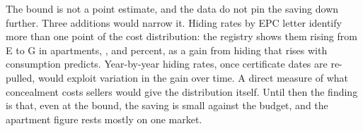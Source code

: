 The bound is not a point estimate, and the data do not pin the saving down further. Three additions would narrow it. Hiding rates by EPC letter identify more than one point of the cost distribution: the registry shows them rising from E to G in apartments, \attHideLetterEApt{}, \attHideLetterFApt{} and \attHideLetterGApt{} percent, as a gain from hiding that rises with consumption predicts. Year-by-year hiding rates, once certificate dates are re-pulled, would exploit variation in the gain over time. A direct measure of what concealment costs sellers would give the distribution itself. Until then the finding is that, even at the bound, the saving is small against the budget, and the apartment figure rests mostly on one market.
